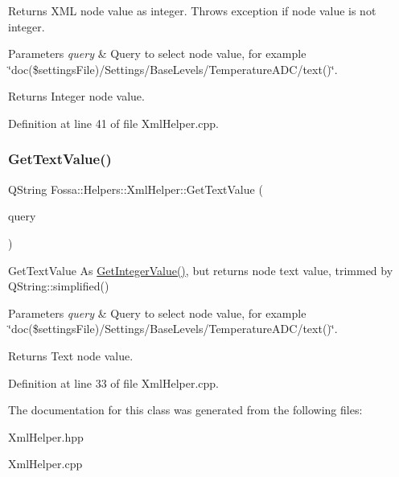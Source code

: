 Returns X\+ML node value as integer. Throws exception if node value is not integer. 


\begin{DoxyParams}{Parameters}
{\em query} & Query to select node value, for example \char`\"{}doc(\$settings\+File)/\+Settings/\+Base\+Levels/\+Temperature\+A\+D\+C/text()\char`\"{}. \\
\hline
\end{DoxyParams}
\begin{DoxyReturn}{Returns}
Integer node value. 
\end{DoxyReturn}


Definition at line 41 of file Xml\+Helper.\+cpp.

\mbox{\label{class_fossa_1_1_helpers_1_1_xml_helper_a2e63bbe1bd57f655ee865171b7a24c4a}} 
\subsubsection{\texorpdfstring{Get\+Text\+Value()}{GetTextValue()}}
{\footnotesize\ttfamily Q\+String Fossa\+::\+Helpers\+::\+Xml\+Helper\+::\+Get\+Text\+Value (\begin{DoxyParamCaption}\item[{const Q\+Xml\+Query $\ast$}]{query }\end{DoxyParamCaption})\hspace{0.3cm}{\ttfamily [static]}}



Get\+Text\+Value As \hyperlink{class_fossa_1_1_helpers_1_1_xml_helper_a7bc8a5dd4d5ab503f274c3bb9a559f84}{Get\+Integer\+Value()}, but returns node text value, trimmed by Q\+String\+::simplified() 


\begin{DoxyParams}{Parameters}
{\em query} & Query to select node value, for example \char`\"{}doc(\$settings\+File)/\+Settings/\+Base\+Levels/\+Temperature\+A\+D\+C/text()\char`\"{}. \\
\hline
\end{DoxyParams}
\begin{DoxyReturn}{Returns}
Text node value. 
\end{DoxyReturn}


Definition at line 33 of file Xml\+Helper.\+cpp.



The documentation for this class was generated from the following files\+:\begin{DoxyCompactItemize}
\item 
Xml\+Helper.\+hpp\item 
Xml\+Helper.\+cpp\end{DoxyCompactItemize}
